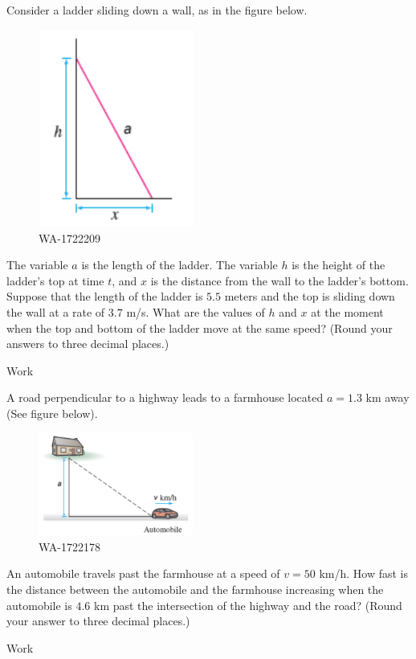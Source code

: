 \documentclass[12pt,addpoints, answers, fleqn]{exam}
\begin{document}
\begin{teacher}
\begin{questions}
Consider a ladder sliding down a wall, as in the figure below.
\begin{figure}[htbp] %
   \centering
   \includegraphics[width=2in]{./graphics/1722209.pdf} 
   \caption{WA-1722209}
   \label{fig:1722209}
\end{figure}
The variable $a$ is the length of the ladder. The variable $h$ is the height of the ladder's top at time $t$, and $x$ is the distance from the wall to the ladder's bottom. Suppose that the length of the ladder is $5.5$ meters and the top is sliding down the wall at a rate of $3.7$ m/s. What are the values of $h$ and $x$ at the moment when the top and bottom of the ladder move at the same speed? (Round your answers to three decimal places.)
\begin{solution}
Work
\end{solution}

\question 	%

A road perpendicular to a highway leads to a farmhouse located $a = 1.3$ km away (See figure below).
\begin{figure}[htbp] %
   \centering
   \includegraphics[width=2in]{./graphics/1722178.pdf} 
   \caption{WA-1722178}
   \label{fig:1722178}
\end{figure}
An automobile travels past the farmhouse at a speed of $v = 50$ km/h. How fast is the distance between the automobile and the farmhouse increasing when the automobile is $4.6$ km past the intersection of the highway and the road? (Round your answer to three decimal places.)
\begin{solution}
Work
\end{solution}



\end{questions}
\end{teacher}
\end{document}
